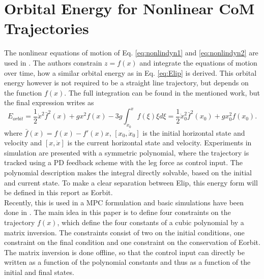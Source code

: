 \section{Orbital Energy for Nonlinear \ac{CoM} Trajectories}
The nonlinear equations of motion of Eq. \eqref{eq:nonlindyn1} and \eqref{eq:nonlindyn2} are used in \cite{pratt2007derivation}. The authors constrain $z=f(x)$ and integrate the equations of motion over time, how a similar orbital energy as in Eq. \eqref{eq:Elip} is derived. This orbital energy however is not required to be a straight line trajectory, but depends on the function $f(x)$. The  full integration can be found in the mentioned work, but the final expression writes as
\begin{equation}
   E_{orbit} = \frac{1}{2}\dot{x}^2\bar{f}^2(x)+gx^2f(x) - 3g\int_{x_0}^xf(\xi)\xi d\xi = \frac{1}{2}\dot{x}_0^2\bar{f}^2(x_0)+gx_0^2f(x_0).
\end{equation}
where $\bar{f}(x)=f(x)-f'(x)x$, $[x_0,\dot{x}_0]$ is the initial horizontal state and velocity and $[x,\dot{x}]$ is the current horizontal state and velocity. Experiments in simulation are presented with a symmetric polynomial, where the trajectory is tracked using a PD feedback scheme with the leg force as control input. The polynomial description makes the integral directly solvable, based on the initial and current state. To make a clear separation between \ac{Elip}, this energy form will be defined in this report as \ac{Eorbit}.\\
Recently, this is used in a \ac{MPC} formulation and basic simulations have been done in \cite{koolen2016balance}. The main idea in this paper is to define four constraints on the trajectory $f(x)$, which define the four constants of a cubic polynomial by a matrix inversion. The constraints consist of two on the initial conditions, one constraint on the final condition and one constraint on the conservation of \ac{Eorbit}. The matrix inversion is done offline, so that the control input can directly be written as a function of the polynomial constants and thus as a function of the initial and final states. 

